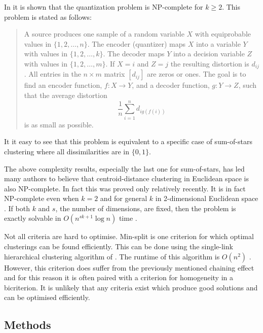 \documentclass[a4paper]{report}
\begin{document}
In \citet{garey82quant} it is shown that the quantization problem is
NP-complete for $k \geq 2$.  This problem is stated as follows:

\begin{quote}
  A source produces one sample of a random variable $X$ with equiprobable
  values in $\{1,2,\dotsc,n\}$.  The encoder (quantizer) maps $X$ into a
  variable $Y$ with values in $\{1,2,\dotsc,k\}$. The decoder maps $Y$ into a
  decision variable $Z$ with values in $\{1,2,\dotsc,m\}$. If $X = i$ and $Z =
  j$ the resulting distortion is $d_{ij}$.  All entries in the $n \times m$
  matrix $[d_{ij}]$ are zeros or ones. The goal is to find an encoder
  function, $f \colon X \to Y$, and a decoder function, $g \colon Y \to Z$,
  such that the average distortion
  \begin{equation*}
    \frac{1}{n} \sum_{i=1}^{n} d_{ig(f(i))}
  \end{equation*}
  is as small as possible.
\end{quote}

It it easy to see that this problem is equivalent to a specific case of
sum-of-stars clustering where all dissimilarities are in $\{0,1\}$.

The above complexity results, especially the last one for sum-of-stars, has
led many authors to believe that centroid-distance clustering in Euclidean
space is also NP-complete.  In fact this was proved only relatively recently.
It is in fact NP-complete even when $k=2$ \citep{aloise09exact} and for
general $k$ in 2-dimensional Euclidean space \citep{mahajan09}.  If both $k$
and $s$, the number of dimensions, are fixed, then the problem is exactly
solvable in $O(n^{sk+1} \log n)$ time \citep{inaba94weightedvoronoi}.

Not all criteria are hard to optimise.  Min-split is one criterion for which
optimal clusterings can be found efficiently.  This can be done using the
single-link hierarchical clustering algorithm of
\citet{johnson67hierarchical}.  The runtime of this algorithm is $O(n^2)$
\citep{delattre1980bicriterion}.  However, this criterion does suffer from the
previously mentioned chaining effect and for this reason it is often paired
with a criterion for homogeneity in a bicriterion.  It is unlikely that any
criteria exist which produce good solutions and can be optimised efficiently.

\subsection{Methods}
\label{sec:methods}
\end{document}
